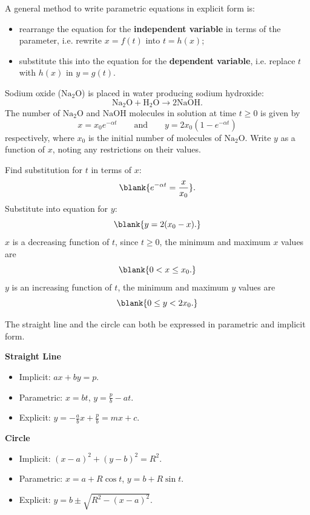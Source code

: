 A general method to write parametric equations in explicit form is:
\begin{itemize}
\item rearrange the equation for the \textbf{independent variable} in terms of the parameter, i.e. rewrite $x=f(t)$ into $t=h(x)$;
\item substitute this into the equation for the \textbf{dependent variable}, i.e. replace $t$ with $h(x)$ in $y=g(t)$.
\end{itemize}

\begin{example}[Lecture]
Sodium oxide ($\mathrm{Na_2O}$) is placed in water producing sodium hydroxide:
\[
\mathrm{Na_2O+H_2O\longrightarrow 2NaOH}.
\]
The number of $\mathrm{Na_2O}$ and $\mathrm{NaOH}$ molecules in solution at time $t\geq0$ is given by
\[
x=x_0e^{-\alpha t} \qquad\text{and}\qquad y=2x_0\left(1-e^{-\alpha t}\right)
\]
respectively, where $x_0$ is the initial number of molecules of $\mathrm{Na_2O}$. Write $y$ as a function of $x$, noting any restrictions on their values.
\end{example}

\begin{solution}
Find substitution for $t$ in terms of $x$:
\[
\blank{e^{-\alpha t}=\frac{x}{x_0}}.
\]
Substitute into equation for $y$:
\[
\blank{y=2(x_0-x).}
\]
$x$ is a decreasing function of $t$, since $t\geq0$, the minimum and maximum $x$ values are
\[
\blank{0<x\leq x_0.}
\]
$y$ is an increasing function of $t$, the minimum and maximum $y$ values are
\[
\blank{0\leq y<2x_0.}
\]
\end{solution}

The straight line and the circle can both be expressed in parametric and implicit form.

\textbf{Straight Line}
\begin{itemize}
    \item Implicit: $ax+by=p$.
    \item Parametric: $x=bt$, $y=\frac{p}{b}-at$.
    \item Explicit: $y=-\frac{a}{b}x+\frac{p}{b}=mx+c$.
\end{itemize}

\textbf{Circle}
\begin{itemize}
\item Implicit: $(x-a)^2+(y-b)^2=R^2$.
\item Parametric: $x=a+R\cos t$, $y=b+R\sin t$.
\item Explicit: $y=b\pm\sqrt{R^2-(x-a)^2}$.
\end{itemize}

